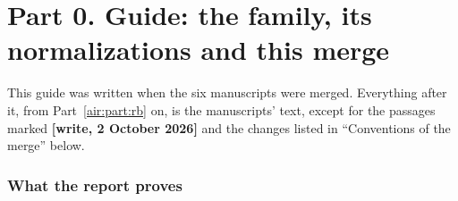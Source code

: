 \documentclass[11pt,letterpaper]{article}
\numberwithin{equation}{section}
\theoremstyle{remark}
\begin{document}
\part*{Part 0. Guide: the family, its normalizations and this merge}
\label{air:part:guide}
This guide was written when the six manuscripts were merged. Everything after it, from Part~\ref{air:part:rb} on, is the manuscripts' text, except for the passages marked \textbf{[write, 2 October 2026]} and the changes listed in ``Conventions of the merge'' below.

\section*{What the report proves}
\label{air:guide:results}
\end{document}
